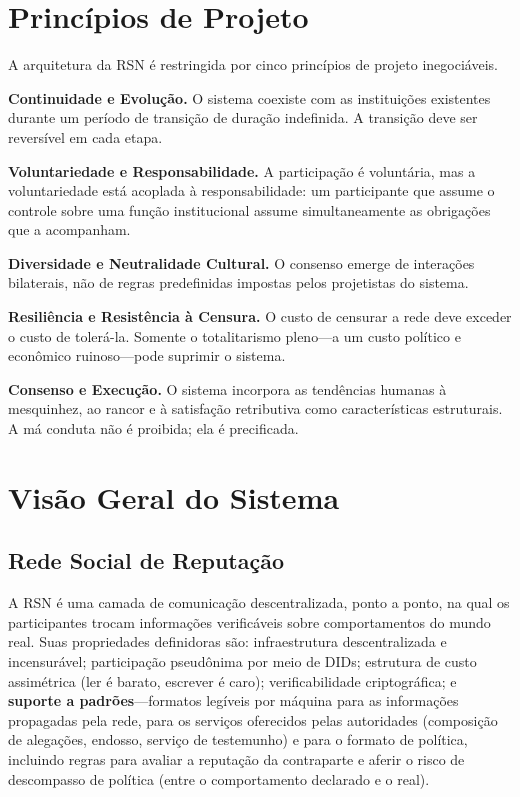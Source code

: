 \documentclass[11pt,a4paper,twocolumn]{article}
\begin{document}
\section{Princípios de Projeto}

A arquitetura da RSN é restringida por cinco princípios de projeto inegociáveis.

\textbf{Continuidade e Evolução.} O sistema coexiste com as instituições existentes durante um período de transição de duração indefinida. A transição deve ser reversível em cada etapa.

\textbf{Voluntariedade e Responsabilidade.} A participação é voluntária, mas a voluntariedade está acoplada à responsabilidade: um participante que assume o controle sobre uma função institucional assume simultaneamente as obrigações que a acompanham.

\textbf{Diversidade e Neutralidade Cultural.} O consenso emerge de interações bilaterais, não de regras predefinidas impostas pelos projetistas do sistema.

\textbf{Resiliência e Resistência à Censura.} O custo de censurar a rede deve exceder o custo de tolerá-la. Somente o totalitarismo pleno---a um custo político e econômico ruinoso---pode suprimir o sistema.

\textbf{Consenso e Execução.} O sistema incorpora as tendências humanas à mesquinhez, ao rancor e à satisfação retributiva como características estruturais. A má conduta não é proibida; ela é precificada.

\section{Visão Geral do Sistema}

\subsection{Rede Social de Reputação}

A RSN é uma camada de comunicação descentralizada, ponto a ponto, na qual os participantes trocam informações verificáveis sobre comportamentos do mundo real. Suas propriedades definidoras são: infraestrutura descentralizada e incensurável; participação pseudônima por meio de DIDs; estrutura de custo assimétrica (ler é barato, escrever é caro); verificabilidade criptográfica; e \textbf{suporte a padrões}---formatos legíveis por máquina para as informações propagadas pela rede, para os serviços oferecidos pelas autoridades (composição de alegações, endosso, serviço de testemunho) e para o formato de política, incluindo regras para avaliar a reputação da contraparte e aferir o risco de descompasso de política (entre o comportamento declarado e o real).
\end{document}

